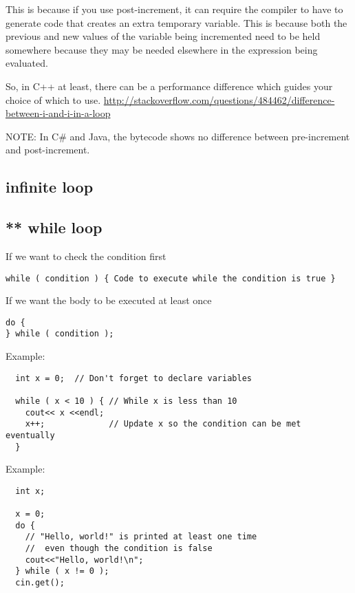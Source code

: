 This is because if you use post-increment, it can require the compiler to have
to generate code that creates an extra temporary variable. This is because both
the previous and new values of the variable being incremented need to be held
somewhere because they may be needed elsewhere in the expression being
evaluated.

So, in C++ at least, there can be a performance difference which guides your
choice of which to use.
\url{http://stackoverflow.com/questions/484462/difference-between-i-and-i-in-a-loop}


NOTE: In C\# and Java, the bytecode shows no difference between pre-increment
and post-increment.

% 


\subsection{infinite loop}

\subsection{** while loop}

If we want to check the condition first
{\small \begin{verbatim} 
while ( condition ) { Code to execute while the condition is true }
\end{verbatim}}

If we want the body to be executed at least once
{\small \begin{verbatim}
do {
} while ( condition );
\end{verbatim}}

Example:
\begin{verbatim}
  int x = 0;  // Don't forget to declare variables
  
  while ( x < 10 ) { // While x is less than 10 
    cout<< x <<endl;
    x++;             // Update x so the condition can be met eventually
  }
\end{verbatim}

Example:
\begin{verbatim}
  int x;

  x = 0;
  do {
    // "Hello, world!" is printed at least one time
    //  even though the condition is false
    cout<<"Hello, world!\n";
  } while ( x != 0 );
  cin.get();
\end{verbatim}

